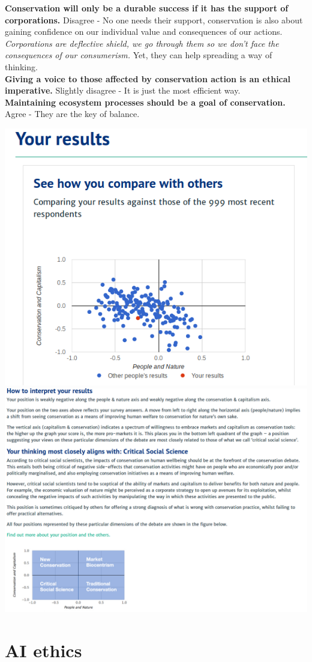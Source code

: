 \documentclass[12pt]{article}
\begin{document}
\textbf{Conservation will only be a durable success if it has the support of corporations.} Disagree - No one needs their support, conservation is also about gaining confidence on our individual value and consequences of our actions. \textit{Corporations are deflective shield, we go through them so we don't face the consequences of our consumerism.} Yet, they can help spreading a way of thinking.\\
\textbf{Giving a voice to those affected by conservation action is an ethical imperative.} Slightly disagree - It is just the most efficient way.\\
\textbf{Maintaining ecosystem processes should be a goal of conservation.} Agree - They are the key of balance.\\

\begin{center}
\includegraphics[scale=0.5]{results.png}
\includegraphics[scale=0.4]{interpretation.png}
\end{center}

\section{AI ethics}
\newpage

\nocite{*}
\end{document}
